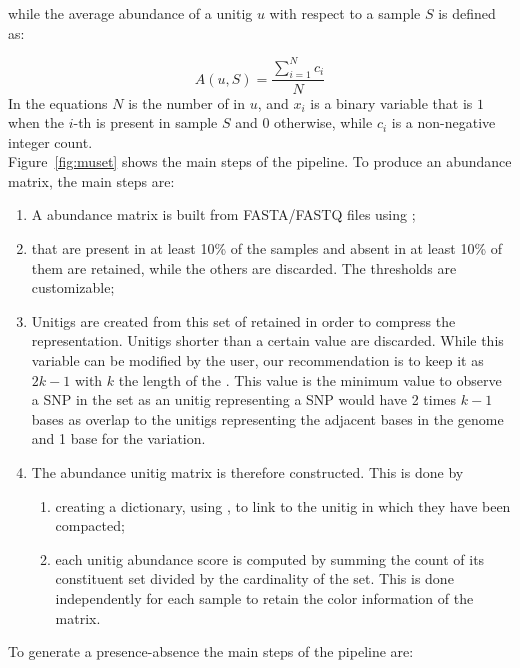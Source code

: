 while the average abundance of a unitig $u$ with respect to a sample $S$ is defined as:

\begin{equation}
	A(u, S) = \frac{\sum_{i=1}^{N}{c_i}}{N}
\end{equation}
In the equations $N$ is the number of \kmers in $u$, and $x_i$ is a binary variable that is $1$ when the $i$-th \kmer is present in sample $S$ and $0$ otherwise, while $c_i$ is a non-negative integer count.\\
Figure~\ref{fig:muset} shows the main steps of the \muset pipeline. To produce an abundance matrix, the main steps are:
\begin{enumerate}
	\item A \kmer abundance matrix is built from FASTA/FASTQ files using \kmt;
	\item \kmers that are present in at least 10\% of the samples and absent in at least 10\% of them are retained, while the others are discarded. The thresholds are customizable;
	\item Unitigs are created from this set of retained \kmers in order to compress the representation. Unitigs shorter than a certain value are discarded. While this variable can be modified by the user, our recommendation is to keep it as $2k-1$ with $k$ the length of the \kmer. This value is the minimum value to observe a SNP in the set as an unitig representing a SNP would have 2 times $k-1$ bases as overlap to the unitigs representing the adjacent bases in the genome and 1 base for the variation.
	\item The abundance unitig matrix is therefore constructed. This is done by 
	\begin{enumerate}
		\item creating a dictionary, using \ssh, to link \kmers to the unitig in which they have been compacted;
		\item each unitig abundance score is computed by summing the count of its constituent \kmer set divided by the cardinality of the set. This is done independently for each sample to retain the color information of the \kmer matrix.
	\end{enumerate} 
\end{enumerate}
To generate a presence-absence the main steps of the pipeline are:
